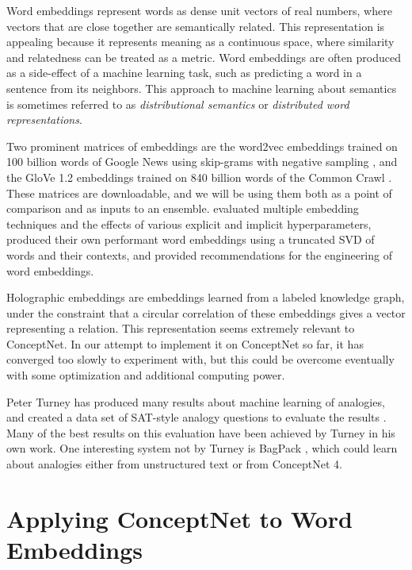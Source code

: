 \documentclass[letterpaper]{article}
\begin{document}
Word embeddings represent words as dense unit vectors of real numbers, where
vectors that are close together are semantically related. This representation
is appealing because it represents meaning as a continuous space, where
similarity and relatedness can be treated as a metric. Word embeddings are
often produced as a side-effect of a machine learning task, such as predicting
a word in a sentence from its neighbors.  This approach to machine learning
about semantics is sometimes referred to as \emph{distributional semantics} or
\emph{distributed word representations}.

Two prominent matrices of embeddings are the word2vec embeddings trained on 100
billion words of Google News using skip-grams with negative sampling
\cite{mikolov2013word2vec}, and the GloVe 1.2 embeddings trained on 840 billion
words of the Common Crawl \cite{pennington2014glove}. These matrices are
downloadable, and we will be using them both as a point of comparison and as
inputs to an ensemble. \citeauthor{levy2015embeddings}
 evaluated multiple embedding techniques and the
effects of various explicit and implicit hyperparameters, produced their own
performant word embeddings using a truncated SVD of words and their contexts,
and provided recommendations for the engineering of word embeddings.

Holographic embeddings \cite{nickel2015holographic} are embeddings learned from
a labeled knowledge graph, under the constraint that a circular correlation of
these embeddings gives a vector representing a relation. This representation
seems extremely relevant to ConceptNet. In our attempt to implement it on
ConceptNet so far, it has converged too slowly to experiment with, but this
could be overcome eventually with some optimization and additional computing
power.

Peter Turney has produced many results about machine learning of analogies, and created
a data set of SAT-style analogy questions to evaluate the results \cite{turney2013supersim}.
Many of the best results on this evaluation have been achieved by Turney in his own work.
One interesting system not by Turney is BagPack \cite{herdagdelen2009bagpack},
which could learn about analogies either from unstructured text or from ConceptNet 4.


\section{Applying ConceptNet to Word Embeddings}
\end{document}
